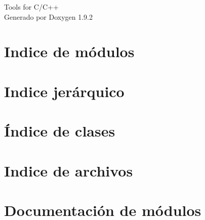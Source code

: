 \documentclass[twoside]{book}
\newcommand{\+}{\discretionary{\mbox{\scriptsize$\hookleftarrow$}}{}{}}
\newcommand{\clearemptydoublepage}{%
    \newpage{\pagestyle{empty}\cleardoublepage}%
  }
\begin{document}
  \raggedbottom
    \hypersetup{pageanchor=false,
                bookmarksnumbered=true,
                pdfencoding=unicode
               }
  \begin{titlepage}
  \vspace*{7cm}
  \begin{center}%
  {\Large Tools  for C/\+C++}\\
  \vspace*{1cm}
  {\large Generado por Doxygen 1.9.2}\\
  \end{center}
  \end{titlepage}
  \clearemptydoublepage
  \tableofcontents
  \clearemptydoublepage
  \hypersetup{pageanchor=true}
\chapter{Indice de módulos}

\chapter{Indice jerárquico}

\chapter{Índice de clases}

\chapter{Indice de archivos}

\chapter{Documentación de módulos}




\end{document}
